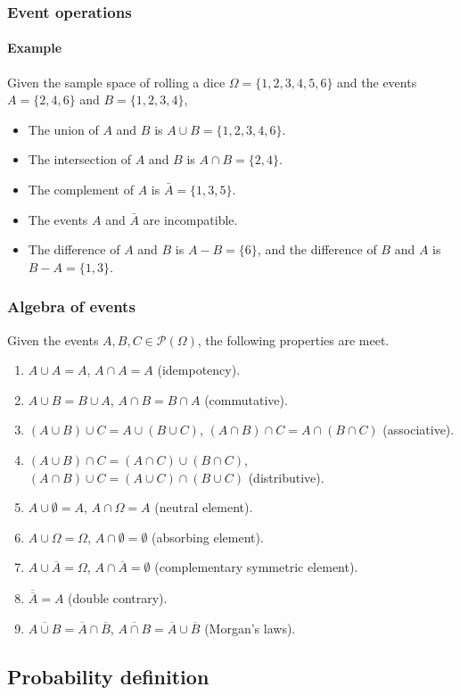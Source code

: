 \begin{frame}
\frametitle{Event operations}
\framesubtitle{Example}
Given the sample space of rolling a dice $\Omega=\{1,2,3,4,5,6\}$ and the events $A=\{2,4,6\}$ and $B=\{1,2,3,4\}$, 
\begin{itemize}
\item The union of $A$ and $B$ is $A\cup B=\{1,2,3,4,6\}$.
\item The intersection of $A$ and $B$ is $A\cap B=\{2,4\}$.
\item The complement of $A$ is $\bar A=\{1,3,5\}$.
\item The events $A$ and $\bar A$ are incompatible.
\item The difference of $A$ and $B$ is $A-B=\{6\}$, and the difference of $B$ and $A$ is $B-A=\{1,3\}$.
\end{itemize}
\end{frame}


\begin{frame}
\frametitle{Algebra of events}
Given the events $A,B,C\in  \mathcal{P}(\Omega)$, the following properties are meet. 
\begin{enumerate}
\item $A\cup A=A$, $A\cap A=A$ (idempotency).
\item $A\cup B=B\cup A$, $A\cap B = B\cap A$ (commutative).
\item $(A\cup B)\cup C = A\cup (B\cup C)$, $(A\cap B)\cap C = A\cap (B\cap C)$ (associative).
\item $(A\cup B)\cap C = (A\cap C)\cup (B\cap C)$, $(A\cap B)\cup C = (A\cup C)\cap (B\cup C)$ (distributive).
\item $A\cup \emptyset=A$, $A\cap \Omega=A$ (neutral element).
\item $A\cup \Omega=\Omega$, $A\cap \emptyset=\emptyset$ (absorbing element).
\item $A\cup \overline A = \Omega$, $A\cap \overline A= \emptyset$ (complementary symmetric element).
\item $\overline{\overline A} = A$ (double contrary).
\item $\overline{A\cup B} = \overline A\cap \overline B$, $\overline{A\cap B} = \overline A\cup \overline B$ (Morgan's
laws).
\end{enumerate}
\end{frame}


\subsection{Probability definition}

